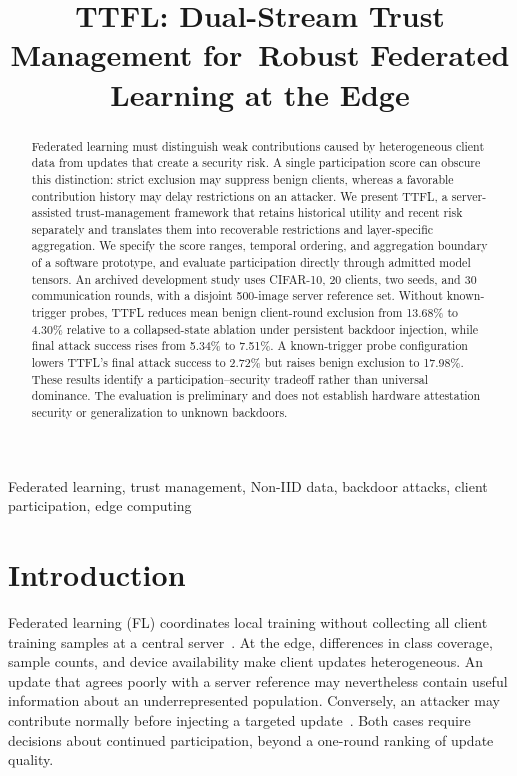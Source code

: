 \documentclass[conference,compsoc]{IEEEtran}
\begin{document}
\title{TTFL: Dual-Stream Trust Management for\ Robust Federated Learning at the Edge}
\author{
}
\maketitle

\begin{abstract}
Federated learning must distinguish weak contributions caused by heterogeneous client data from updates that create a security risk. A single participation score can obscure this distinction: strict exclusion may suppress benign clients, whereas a favorable contribution history may delay restrictions on an attacker. We present TTFL, a server-assisted trust-management framework that retains historical utility and recent risk separately and translates them into recoverable restrictions and layer-specific aggregation. We specify the score ranges, temporal ordering, and aggregation boundary of a software prototype, and evaluate participation directly through admitted model tensors. An archived development study uses CIFAR-10, 20 clients, two seeds, and 30 communication rounds, with a disjoint 500-image server reference set. Without known-trigger probes, TTFL reduces mean benign client-round exclusion from 13.68\% to 4.30\% relative to a collapsed-state ablation under persistent backdoor injection, while final attack success rises from 5.34\% to 7.51\%. A known-trigger probe configuration lowers TTFL's final attack success to 2.72\% but raises benign exclusion to 17.98\%. These results identify a participation--security tradeoff rather than universal dominance. The evaluation is preliminary and does not establish hardware attestation security or generalization to unknown backdoors.
\end{abstract}

\begin{IEEEkeywords}
Federated learning, trust management, Non-IID data, backdoor attacks, client participation, edge computing
\end{IEEEkeywords}

\section{Introduction}
Federated learning (FL) coordinates local training without collecting all client training samples at a central server~\cite{mcmahan2017fedavg,kairouz2021flsurvey}. At the edge, differences in class coverage, sample counts, and device availability make client updates heterogeneous. An update that agrees poorly with a server reference may nevertheless contain useful information about an underrepresented population. Conversely, an attacker may contribute normally before injecting a targeted update~\cite{bagdasaryan2020backdoor}. Both cases require decisions about continued participation, beyond a one-round ranking of update quality.
\end{document}
